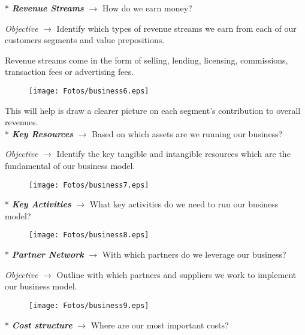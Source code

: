 \documentclass[11pt,a4paper]{article}
\begin{document}
* \emph{\textbf{Revenue Streams}} $\to$ How do we earn money?

\emph{Objective} $\to$ Identify which types of revenue streams we earn from each of our customers segments and value prepositions.

Revenue streams come in the form of selling, lending, licensing, commissions, transaction fees or advertising fees.
\begin{figure}[hbtp]
\begin{center}
\texttt{[image: Fotos/business6.eps]}
\end{center}
\end{figure}

This will help is draw a clearer picture on each segment's contribution to overall revenues.\\

* \emph{\textbf{Key Resources}} $\to$ Based on which assets are we running our business?

\emph{Objective} $\to$ Identify the key tangible and intangible resources which are the fundamental of our business model.\\
\begin{figure}[hbtp]
\begin{center}
\texttt{[image: Fotos/business7.eps]}
\end{center}
\end{figure}

* \emph{\textbf{Key Activities}} $\to$ What key activities do we need to run our business model?\\
\begin{figure}[hbtp]
\begin{center}
\texttt{[image: Fotos/business8.eps]}
\end{center}
\end{figure}

* \emph{\textbf{Partner Network}} $\to$ With which partners do we leverage our business?

\emph{Objective} $\to$ Outline with which partners and suppliers we work to implement our business model.\\
\begin{figure}[!H]
\begin{center}
\texttt{[image: Fotos/business9.eps]}
\end{center}
\end{figure}

* \emph{\textbf{Cost structure}} $\to$ Where are our most important costs?
\end{document}
